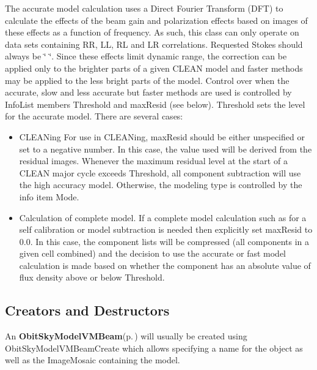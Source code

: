 The accurate model calculation uses a Direct Fourier Transform (DFT) to calculate the effects of the beam gain and polarization effects based on images of these effects as a function of frequency. As such, this class can only operate on data sets containing RR, LL, RL and LR correlations. Requested Stokes should always be \char`\"{}    \char`\"{}. Since these effects limit dynamic range, the correction can be applied only to the brighter parts of a given CLEAN model and faster methods may be applied to the less bright parts of the model. Control over when the accurate, slow and less accurate but faster methods are used is controlled by Info\-List members Threshold and max\-Resid (see below). Threshold sets the level for the accurate model. There are several cases: \begin{itemize}
\item CLEANing For use in CLEANing, max\-Resid should be either unspecified or set to a negative number. In this case, the value used will be derived from the residual images. Whenever the maximum residual level at the start of a CLEAN major cycle exceeds Threshold, all component subtraction will use the high accuracy model. Otherwise, the modeling type is controlled by the info item Mode. \item Calculation of complete model. If a complete model calculation such as for a self calibration or model subtraction is needed then explicitly set max\-Resid to 0.0. In this case, the component lists will be compressed (all components in a given cell combined) and the decision to use the accurate or fast model calculation is made based on whether the component has an absolute value of flux density above or below Threshold.\end{itemize}
\subsection{Creators and Destructors}\label{ObitSkyModelVMBeam_8h_ObitSkyModelVMBeamaccess}
An {\bf Obit\-Sky\-Model\-VMBeam}{\rm (p.\,\pageref{structObitSkyModelVMBeam})} will usually be created using Obit\-Sky\-Model\-VMBeam\-Create which allows specifying a name for the object as well as the Image\-Mosaic containing the model.

